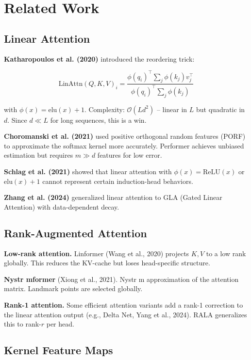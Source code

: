 
\section{Related Work}

\subsection{Linear Attention}

\textbf{Katharopoulos et al. (2020)} introduced the reordering trick:

\[
\text{LinAttn}(Q, K, V)_i = \frac{\phi(q_i)^\top \sum_j \phi(k_j) v_j^\top}{\phi(q_i)^\top \sum_j \phi(k_j)}
\tag{2.1}
\]

with $\phi(x) = \mathrm{elu}(x) + 1$. Complexity: $\mathcal{O}(L d^2)$ -- 
linear in $L$ but quadratic in $d$. Since $d \ll L$ for long sequences, 
this is a win.

\textbf{Choromanski et al. (2021)} used positive orthogonal random features 
(PORF) to approximate the softmax kernel more accurately. Performer achieves 
unbiased estimation but requires $m \gg d$ features for low error.

\textbf{Schlag et al. (2021)} showed that linear attention with $\phi(x) = 
\mathrm{ReLU}(x)$ or $\mathrm{elu}(x) + 1$ cannot represent certain 
induction-head behaviors.

\textbf{Zhang et al. (2024)} generalized linear attention to GLA (Gated Linear 
Attention) with data-dependent decay.

\subsection{Rank-Augmented Attention}

\textbf{Low-rank attention.} Linformer (Wang et al., 2020) projects $K, V$ to a 
low rank globally. This reduces the KV-cache but loses head-specific 
structure.

\textbf{Nystr mformer} (Xiong et al., 2021). Nystr m approximation of the attention 
matrix. Landmark points are selected globally.

\textbf{Rank-1 attention.} Some efficient attention variants add a rank-1 
correction to the linear attention output (e.g., Delta Net, Yang et al., 
2024). RALA generalizes this to rank-$r$ per head.

\subsection{Kernel Feature Maps}


